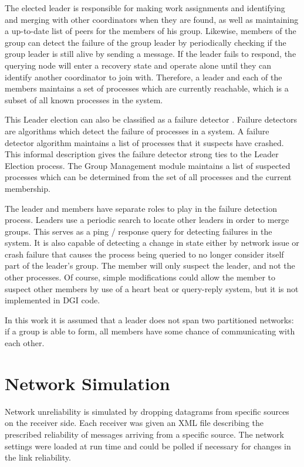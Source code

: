 The elected leader is responsible for making work assignments and identifying and merging with other coordinators when they are found, as well as maintaining a up-to-date list of peers for the members of his group.  Likewise, members of  the group can detect the failure of the group leader by periodically checking  if the group leader is still alive by sending a message. If the leader fails to  respond, the querying node will enter a recovery state and operate alone until  they can identify another coordinator to join with. Therefore, a leader and each of the members maintains a set of processes which are currently reachable, which is a subset of all known processes in the system.

This Leader election can also be classified as a failure detector \cite{LEADERELECTIONEVAL}. Failure detectors are algorithms which detect the failure of processes in a system. A failure detector algorithm maintains a list of processes that it suspects have crashed. This informal description gives the failure detector strong ties to the Leader Election process. The Group Management module maintains a list of  suspected processes which can be determined from the set of all processes and the current membership. 

The leader and members have separate roles to play in the failure detection process. Leaders use a periodic search to locate other leaders in order to merge groups. This serves as a ping / response query for detecting failures in the system. It is also capable of detecting a change in state either by network issue or crash failure that causes the process being queried to no longer consider itself part of the leader's group. The member will only suspect the leader, and not the other processes.
Of course, simple modifications could allow the member to suspect other members by use of a heart beat or query-reply system, but it is not implemented in DGI code.

In this work it is assumed that a leader does not span two partitioned networks: if a group is able to form, all members have some chance of communicating with each other.

\section{Network Simulation}

Network unreliability is simulated by dropping datagrams from specific sources on the receiver side. Each receiver was given an XML file describing the prescribed reliability of messages arriving from a specific source. The network settings were loaded at run time and could be polled if necessary for changes in the link reliability.

